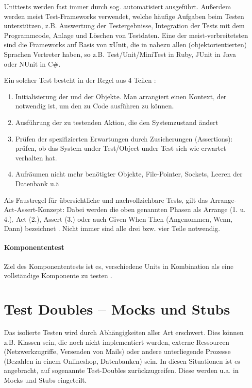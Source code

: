 Unittests werden fast immer durch sog.  automatisiert ausgeführt. Außerdem werden meist Test-Frameworks verwendet, welche häufige Aufgaben beim Testen unterstützen, z.B. Auswertung der Testergebnisse, Integration der Tests mit dem Programmcode, Anlage und Löschen von Testdaten.  Eine der meist-verbreitetsten sind die Frameworks auf Basis von xUnit, die in nahezu allen (objektorientierten) Sprachen Vertreter haben, so z.B. Test/Unit/MiniTest in Ruby, JUnit in Java oder NUnit in C\#.

Ein solcher Test besteht in der Regel aus 4 Teilen \citep{rappin_rails_2011} \citep[Karte 46]{langr_agile_2011}:
\begin{enumerate}
 \item Initialisierung der  und der Objekte. Man arrangiert einen Kontext, der notwendig ist, um den zu Code ausführen zu können.
 \item Ausführung der zu testenden Aktion, die den Systemzustand ändert
 \item Prüfen der spezifizierten Erwartungen durch Zusicherungen (Assertions): prüfen, ob das System under Test/Object under Test sich wie erwartet verhalten hat.
 \item Aufräumen nicht mehr benötigter Objekte, File-Pointer, Sockets, Leeren der Datenbank u.ä
\end{enumerate}
Als Faustregel für übersichtliche und nachvollziehbare Tests, gilt das Arrange-Act-Assert-Konzept: Dabei werden die oben genannten Phasen als Arrange (1. u. 4.), Act (2.), Assert (3.) oder auch Given-When-Then (Angenommen, Wenn, Dann) bezeichnet \citep[Karte 46]{langr_agile_2011}. Nicht immer sind alle drei bzw. vier Teile notwendig.

\paragraph{Komponententest}
Ziel des Komponententests ist es, verschiedene Units in Kombination als eine vollständige Komponente zu testen \citep{goodliffe_code_2006}.

 \section{Test Doubles -- Mocks und Stubs}
  \label{sec:mocks}
  Das isolierte Testen wird durch Abhängigkeiten aller Art erschwert. Dies können z.B. Klassen sein, die noch nicht implementiert wurden, externe Ressourcen (Netzwerkzugriffe, Versenden von Mails) oder andere unterliegende Prozesse (Bezahlen in einem Onlineshop, Datenbanken) sein. In diesen Situationen ist es angebracht, auf sogenannte Test-Doubles zurückzugreifen. Diese werden u.a. in Mocks und Stubs eingeteilt.

